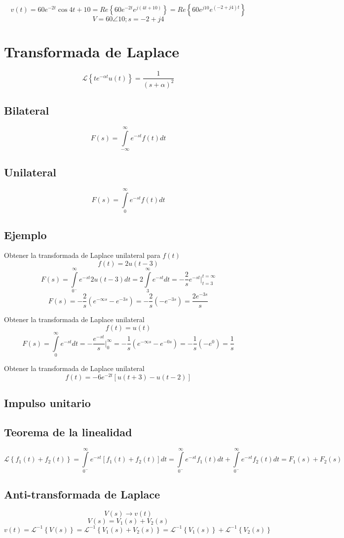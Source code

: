 \documentclass[11pt]{article}
\begin{document}
$$v(t)=60 e^{-2t} \cos{4t+10} = Re \left\{ 60 e^{-2t} e^{j (4t+10)} \right\}=Re \left\{ 60 e^{j10} e^{(-2+j4)t} \right\}$$
$$V=60\angle 10;s=-2+j4$$
\section{Transformada de Laplace}
\label{sec:orgheadline26}
$$\mathcal{L}\left\{ te^{-\alpha t}u(t) \right\}=\frac{1}{(s+\alpha)^2}$$
\subsection{Bilateral}
\label{sec:orgheadline16}
$$F(s)=\int\limits_{-\infty}^{\infty} e^{-st} f (t)dt $$
\subsection{Unilateral}
\label{sec:orgheadline17}
$$F(s)=\int\limits_{0}^{\infty} e^{-st} f (t)dt $$
\subsection{Ejemplo}
\label{sec:orgheadline18}
Obtener la transformada de Laplace unilateral para \(f(t)\)
$$f (t)=2u (t-3)$$
$$F (s)=\int\limits_{0^-}^{\infty} e^{-st} 2u (t-3)dt=2\int\limits_{3}^{\infty} e^{-st}dt=-\frac{2}{s} e^{-st}\bigg|^{t=\infty}_{t=3}$$
$$F (s)=-\frac{2}{s} (e^{-\infty s}-e^{-3 s})=-\frac{2}{s} (- e^{-3s})=\frac{2e^{-3s}}{s}$$

Obtener la transformada de Laplace unilateral
$$f (t)=u(t)$$
$$F (s)=\int\limits_0^{\infty}e^{-st}dt=-\frac{e^{-st}}{s}\bigg|^{\infty}_0=-\frac{1}{s} (e^{-\infty s}-e^{-0s}) =-\frac{1}{s} (-e^0)=\frac{1}{s} $$

Obtener la transformada de Laplace unilateral
$$f (t)=-6e^{-2t}\left[ u (t+3)-u (t-2) \right] $$
\subsection{Impulso unitario}
\label{sec:orgheadline19}
\subsection{Teorema de la linealidad}
\label{sec:orgheadline20}
$$\mathcal{L}\left\{ f_1(t)+f_2(t) \right\}=\int\limits_{0^-}^{\infty}e^{-st}\left[ f_1(t)+f_2(t) \right]dt=\int\limits_{0^-}^{\infty}e^{-st}f_1(t)dt+\int\limits_{0^-}^{\infty}e^{-st}f_2(t)dt=F_1(s)+F_2(s)$$
\subsection{Anti-transformada de Laplace}
\label{sec:orgheadline22}
$$V(s)\rightarrow v(t)$$
$$V(s)=V_1(s)+V_2(s)$$
$$v(t)=\mathcal{L}^{-1}\left\{ V(s) \right\}=\mathcal{L}^{-1}\left\{ V_1(s) + V_2(s)\right\}=\mathcal{L}^{-1}\left\{ V_1(s)\right\}+\mathcal{L}^{-1}\left\{V_2(s)\right\}$$
\end{document}
